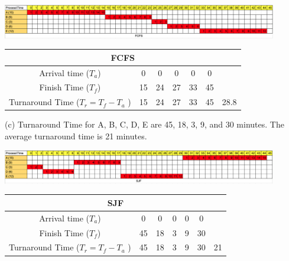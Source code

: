 \documentclass[12pt]{article}
\newenvironment{sol}[1][Solution]{\begin{trivlist}\item[\hskip\labelsep {\bfseries #1:}]}{\end{trivlist}}
\begin{document}
\begin{enumerate}
\begin{sol}
        \begin{center}
        \includegraphics[width=0.9\textwidth]{7.png}
        \begin{tabular}{|c|c|c|c|c|c|c|}
        \hline
        \multicolumn{7}{|c|}{FCFS}  \\
        \hline 
         Arrival time ($T_a$) & 0 & 0 & 0 & 0 & 0 & \\
        \hline
         Finish Time ($T_f$)& 15 & 24 & 27 & 33 & 45 & \\
        \hline
         Turnaround Time ($T_r = T_f - T_a$ ) & 15 & 24 & 27 & 33 & 45 & 28.8  \\ 
         \hline
         \end{tabular}
        \end{center}
        
    (c)  Turnaround Time for A, B, C, D, E are 45, 18, 3, 9, and 30 minutes. The average turnaround time is 21 minutes.

        \begin{center}
        \includegraphics[width=0.9\textwidth]{8.png}
        \begin{tabular}{|c|c|c|c|c|c|c|}
        \hline
        \multicolumn{7}{|c|}{SJF}  \\
        \hline 
         Arrival time ($T_a$) & 0 & 0 & 0 & 0 & 0 & \\
        \hline
         Finish Time ($T_f$)& 45 & 18 & 3 & 9 & 30 & \\
        \hline
         Turnaround Time ($T_r = T_f - T_a$ ) & 45 & 18 & 3 & 9 & 30 & 21  \\ 
         \hline
         \end{tabular}
        \end{center}
        
        
    \end{sol}
\end{enumerate}
\end{document}
